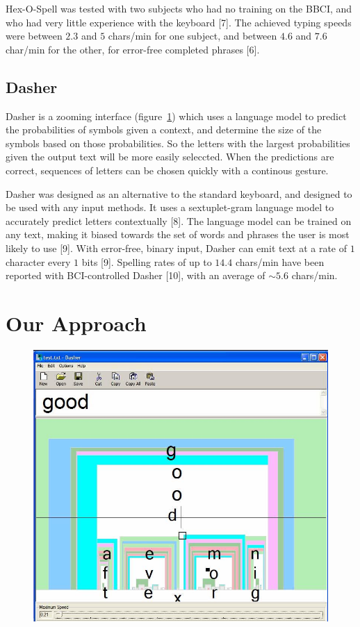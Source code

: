 \documentclass[12pt,titlepage]{article}
\begin{document}
Hex-O-Spell was tested with two subjects who had no training on the BBCI, and who had very little 
experience with the keyboard [7].  The achieved typing speeds were between $2.3$ and $5$ chars/min for 
one subject, and between $4.6$ and $7.6$ char/min for the other, for error-free completed phrases [6].

\subsection{Dasher}

Dasher is a zooming interface (figure~\ref{fig:Dash}) which uses a language model to predict the probabilities of 
symbols given a context, and determine the size of the symbols based on those probabilities.  So the 
letters with the largest probabilities given the output text will be more easily seleccted.  When the 
predictions are correct, sequences of letters can be chosen quickly with a continous gesture.

Dasher was designed as an alternative to the standard keyboard, and designed to be used with any input 
methods.  It uses a sextuplet-gram language model to accurately predict letters contextually [8]. The 
language model can be trained on any text, making it biased towards the set of words and phrases the 
user is most likely to use [9].  With error-free, binary input, Dasher can emit text at a rate of $1$ character 
every $1$ bits [9].  Spelling rates of up to $14.4$ chars/min have been reported with BCI-controlled Dasher [10], 
with an average of $\sim5.6$ chars/min.


\section{Our Approach}

\begin{figure}[t]
\begin{center}
	\includegraphics[scale=0.25]{figure4.jpeg}
	\label{fig:Dash}
\end{center}
\end{figure}
\end{document}
